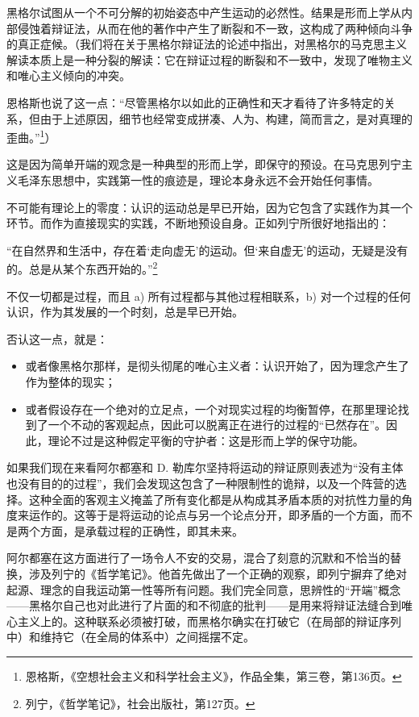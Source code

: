 \documentclass[fontset=fandol, a4paper, 12pt, twoside]{ctexart}
\renewenvironment{quote}
  {\list{}{\rightmargin=0cm \leftmargin=2em}%
   \item\relax\small\kaishu\color{black}}
  {\endlist}
\begin{document}
黑格尔试图从一个不可分解的初始姿态中产生运动的必然性。结果是形而上学从内部侵蚀着辩证法，从而在他的著作中产生了断裂和不一致，这构成了两种倾向斗争的真正症候。（我们将在关于黑格尔辩证法的论述中指出，对黑格尔的马克思主义解读本质上是一种分裂的解读：它在辩证过程的断裂和不一致中，发现了唯物主义和唯心主义倾向的冲突。

恩格斯也说了这一点：“尽管黑格尔以如此的正确性和天才看待了许多特定的关系，但由于上述原因，细节也经常变成拼凑、人为、构建，简而言之，是对真理的歪曲。”\footnote{恩格斯，《空想社会主义和科学社会主义》，作品全集，第三卷，第136页。}）

这是因为简单开端的观念是一种典型的形而上学，即保守的预设。在马克思列宁主义毛泽东思想中，实践第一性的痕迹是，理论本身永远不会开始任何事情。

不可能有理论上的零度：认识的运动总是早已开始，因为它包含了实践作为其一个环节。而作为直接现实的实践，不断地预设自身。正如列宁所很好地指出的：

\begin{quote}
“在自然界和生活中，存在着‘走向虚无’的运动。但‘来自虚无’的运动，无疑是没有的。总是从某个东西开始的。”\footnote{列宁，《哲学笔记》，社会出版社，第127页。}
\end{quote}

不仅一切都是过程，而且 a) 所有过程都与其他过程相联系，b) 对一个过程的任何认识，作为其发展的一个时刻，总是早已开始。

否认这一点，就是：

\begin{itemize}
    \item 或者像黑格尔那样，是彻头彻尾的唯心主义者：认识开始了，因为理念产生了作为整体的现实；
    \item 或者假设存在一个绝对的立足点，一个对现实过程的均衡暂停，在那里理论找到了一个不动的客观起点，因此可以脱离正在进行的过程的“已然存在”。因此，理论不过是这种假定平衡的守护者：这是形而上学的保守功能。
\end{itemize}

如果我们现在来看阿尔都塞和 D. 勒库尔坚持将运动的辩证原则表述为“没有主体也没有目的的过程”，我们会发现这包含了一种限制性的诡辩，以及一个阵营的选择。这种全面的客观主义掩盖了所有变化都是从构成其矛盾本质的对抗性力量的角度来运作的。这等于是将运动的论点与另一个论点分开，即矛盾的一个方面，而不是两个方面，是承载过程的正确性，即其未来。

阿尔都塞在这方面进行了一场令人不安的交易，混合了刻意的沉默和不恰当的替换，涉及列宁的《哲学笔记》。他首先做出了一个正确的观察，即列宁摒弃了绝对起源、理念的自我运动第一性等所有问题。我们完全同意，思辨性的“开端”概念——黑格尔自己也对此进行了片面的和不彻底的批判——是用来将辩证法缝合到唯心主义上的。这种联系必须被打破，而黑格尔确实在打破它（在局部的辩证序列中）和维持它（在全局的体系中）之间摇摆不定。
\end{document}
